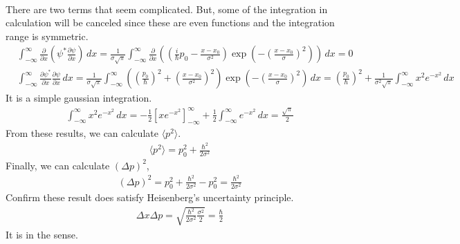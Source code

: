 \documentclass[aps,floatfix,nofootinbib,superscriptaddress,fleqn]{revtex4}
\begin{document}
\begin{itemize}
\begin{align}
    \end{align}
  There are two terms that seem complicated. But, some of the integration in calculation will be canceled since these are even functions and the integration range is symmetric.
    \begin{align}   
         &\int_{-\infty}^{\infty} \frac{\partial}{\partial x}
            \left(\psi^* \frac{\partial \psi}{\partial x}
            \right) \,dx 
            = \frac{1}{\sigma\sqrt{\pi}}\int_{-\infty}^{\infty}\frac{\partial}{\partial x}
              \left(
                \left(\frac{i}{\hbar}p_0-\frac{x-x_0}{\sigma^2}
                \right)\exp
                  \left(-{
                    \left(\frac{x-x_0}{\sigma}
                    \right)}^2 
                  \right)
                \right)\,dx = 0
     \\  &\int_{-\infty}^{\infty} \frac{\partial \psi^*}{\partial x}\frac{\partial \psi}{\partial x} \,dx 
            = \frac{1}{\sigma\sqrt{\pi}}\int_{-\infty}^{\infty}
              \left(
                \left(\frac{p_0}{\hbar}
                                       \right)^2
               +\left(\frac{x-x_0}{\sigma^2}
                                            \right)^2
                                                      \right)\exp
              \left(-{
                \left(\frac{x-x_0}{\sigma}
                                          \right)}^2
                                                    \right)\,dx 
            = \left(\frac{p_0}{\hbar}
                                      \right)^2+\frac{1}{\sigma^2\sqrt{\pi}}\int_{-\infty}^{\infty} x^2e^{-x^2}\,dx
    \end{align}
  It is a simple gaussian integration.
    \begin{align}
      \int_{-\infty}^{\infty} x^2e^{-x^2}\,dx = -\frac{1}{2}\left[xe^{-x^2}\right]^{\infty}_{-\infty}+\frac{1}{2}\int_{-\infty}^{\infty} e^{-x^2}\,dx = \frac{\sqrt{\pi}}{2}
    \end{align}
  From these results, we can calculate $\langle p^2 \rangle$.
    \begin{align}
      \langle p^2 \rangle = p_0^2 + \frac{\hbar^2}{2\sigma^2}
    \end{align}
  Finally, we can calculate $\left( \Delta p \right)^2$,
    \begin{align}
      \left( \Delta p \right)^2 = p_0^2 + \frac{\hbar^2}{2\sigma^2} - p_0^2 = \frac{\hbar^2}{2\sigma^2}
    \end{align}
  Confirm these result does satisfy Heisenberg's uncertainty principle.
    \begin{align}
      \Delta x \Delta p = \sqrt{\frac{\hbar^2}{2\sigma^2}\frac{\sigma^2}{2}} = \frac{\hbar}{2}
    \end{align}
  It is in the sense.
\end{itemize}
\end{document}
